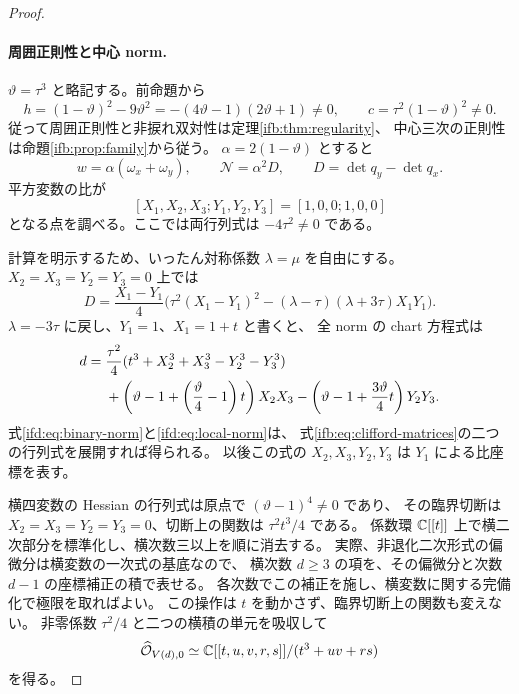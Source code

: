 \begin{proof}
\paragraph{周囲正則性と中心 norm.}
$\vartheta=\tau^3$ と略記する。前命題から
\begin{equation}\label{ifd:eq:symmetric-good-locus}
 h=(1-\vartheta)^2-9\vartheta^2
      =-(4\vartheta-1)(2\vartheta+1)\ne0,
 \qquad c=\tau^2(1-\vartheta)^2\ne0.
\end{equation}
従って周囲正則性と非捩れ双対性は定理\ref{ifb:thm:regularity}、
中心三次の正則性は命題\ref{ifb:prop:family}から従う。
$\alpha=2(1-\vartheta)$ とすると
\[
       w=\alpha(\omega_x+\omega_y),\qquad
       \mathcal N=\alpha^2 D,\qquad D=\det q_y-\det q_x.
\]
平方変数の比が
\begin{equation}\label{ifd:eq:central-point}
        [X_1,X_2,X_3;Y_1,Y_2,Y_3]=[1,0,0;1,0,0]
\end{equation}
となる点を調べる。ここでは両行列式は $-4\tau^2\ne0$ である。

計算を明示するため、いったん対称係数 $\lambda=\mu$ を自由にする。
$X_2=X_3=Y_2=Y_3=0$ 上では
\begin{equation}\label{ifd:eq:binary-norm}
 D=\frac{X_1-Y_1}{4}
       \bigl(\tau^2(X_1-Y_1)^2
                    -(\lambda-\tau)(\lambda+3\tau)X_1Y_1\bigr).
\end{equation}
$\lambda=-3\tau$ に戻し、$Y_1=1$、$X_1=1+t$ と書くと、
全 norm の chart 方程式は
\begin{align}
 d={}&\frac{\tau^2}{4}
       (t^3+X_2^3+X_3^3-Y_2^3-Y_3^3)\notag\\
 &+\left(\vartheta-1+
                  \left(\frac{\vartheta}{4}-1\right)t\right)X_2X_3
   -\left(\vartheta-1+\frac{3\vartheta}{4}t\right)Y_2Y_3.
       \label{ifd:eq:local-norm}
\end{align}
式\eqref{ifd:eq:binary-norm}と\eqref{ifd:eq:local-norm}は、
式\eqref{ifb:eq:clifford-matrices}の二つの行列式を展開すれば得られる。
以後この式の $X_2,X_3,Y_2,Y_3$ は $Y_1$ による比座標を表す。

横四変数の Hessian の行列式は原点で $(\vartheta-1)^4\ne0$ であり、
その臨界切断は $X_2=X_3=Y_2=Y_3=0$、切断上の関数は $\tau^2t^3/4$ である。
係数環 $\mathbb C[[t]]$ 上で横二次部分を標準化し、横次数三以上を順に消去する。
実際、非退化二次形式の偏微分は横変数の一次式の基底なので、
横次数 $d\ge3$ の項を、その偏微分と次数 $d-1$ の座標補正の積で表せる。
各次数でこの補正を施し、横変数に関する完備化で極限を取ればよい。
この操作は $t$ を動かさず、臨界切断上の関数も変えない。
非零係数 $\tau^2/4$ と二つの横積の単元を吸収して
\begin{equation}\label{ifd:eq:center-a2}
       \widehat{\mathcal O}_{V(d),0}
          \simeq\mathbb C[[t,u,v,r,s]]/(t^3+uv+rs)
\end{equation}
を得る。


\end{proof}
